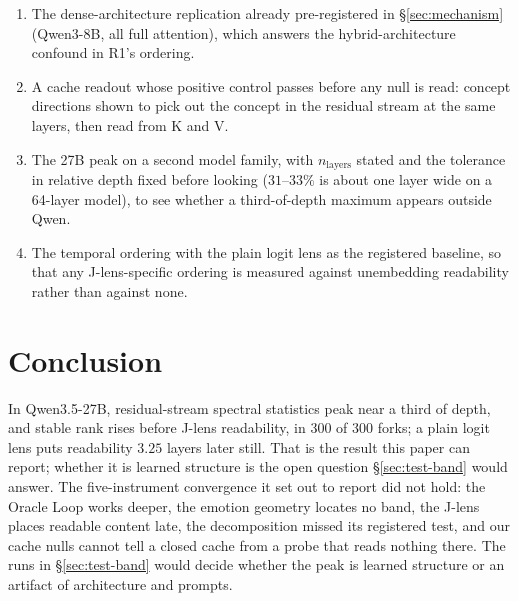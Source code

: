 \documentclass[11pt,a4paper]{article}
\begin{document}
\begin{enumerate}[nosep]
  matched in length, for each of the two sets the peak rests on: the 90
  prompts behind $d_\text{eff}$ and the 60 prompts (300 forks) behind
  stable rank. A randomly initialized model separates architecture from
  learning, but not learning from these prompts.
\item The dense-architecture replication already pre-registered in
  \S\ref{sec:mechanism} (Qwen3-8B, all full attention), which answers
  the hybrid-architecture confound in R1's ordering.
\item A cache readout whose positive control passes before any null
  is read: concept directions shown to pick out the concept in the
  residual stream at the same layers, then read from K and V.
\item The 27B peak on a second model family, with $n_\text{layers}$
  stated and the tolerance in relative depth fixed before looking
  ($31$--$33\%$ is about one layer wide on a 64-layer model), to see
  whether a third-of-depth maximum appears outside Qwen.
\item The temporal ordering with the plain logit lens as the registered
  baseline, so that any J-lens-specific ordering is measured against
  unembedding readability rather than against none.
\end{enumerate}

\section{Conclusion}
\label{sec:conclusion}

In Qwen3.5-27B, residual-stream spectral statistics peak near a third of
depth, and stable rank rises before J-lens readability, in 300 of 300
forks; a plain logit lens puts readability $3.25$ layers later still. That is the result this paper can report; whether it
is learned structure is the open question \S\ref{sec:test-band} would
answer. The
five-instrument convergence it set out to report did not hold: the
Oracle Loop works deeper, the emotion geometry locates no band, the
J-lens places readable content late, the decomposition missed its
registered test, and our cache nulls cannot tell a closed cache from a
probe that reads nothing there. The runs in \S\ref{sec:test-band} would
decide whether the peak is learned structure or an artifact of
architecture and prompts.
\end{document}
